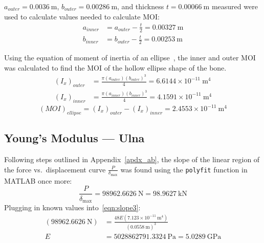 \documentclass[conference, letterpaper]{IEEEtran}
\begin{document}
            \(a_{outer} = 0.0036\ \text{m}\), \(b_{outer} = 0.00286\ \text{m}\), and thickness \(t = 0.00066\ \text{m}\) measured were used to calculate values needed to calculate MOI:\@
            \begin{align*}
                a_{inner} &= a_{outer} - \frac{t}{2} = 0.00327\ \text{m}\\
                b_{inner} &= b_{outer} - \frac{t}{2} = 0.00253\ \text{m}
            \end{align*} 

            Using the equation of moment of inertia of an ellipse~\cite{3LM2023}, the inner and outer MOI was calculated to find the MOI of the hollow ellipse shape of the bone.
            \begin{align*}
                {(I_x)}_{outer}
                &= \frac{\pi (a_{outer}) {(b_{outer})}^3}{4} = 6.6144\times10^{-11}\ \text{m}^4\\
                {(I_x)}_{inner}
                &= \frac{\pi (a_{inner}) {(b_{inner})}^3}{4} = 4.1591\times10^{-11}\ \text{m}^4
            \end{align*}
            \[
                {(MOI)}_{ellipse} 
                = {(I_x)}_{outer} - {(I_x)}_{inner} 
                = 2.4553\times10^{-11}\ \text{m}^4
            \]
            
        \subsection{Young's Modulus --- Ulna}\label{apdx_bb}
            Following steps outlined in Appendix~\ref{apdx_ab}, the slope of the linear region of the force vs.\ displacement curve \(\frac{P}{\delta_{\max}}\) was found using the \texttt{polyfit} function in MATLAB once more:\@
            \[
                \frac{P}{\delta_{\max}} 
                = 98962.6626\ \text{N}
                = 98.9627\ \text{kN}
            \]
            Plugging in known values into~\eqref{eqn:slope3}:
            \begin{align*}
                (98962.6626\ \text{N})
                &= \frac{48E(7.123\times10^{-11}\ \text{m}^4)}{{(0.0558\ \text{m})}^3}\\
                E 
                &= 5028862791.3324\ \text{Pa}
                = 5.0289\ \text{GPa}
            \end{align*}
\end{document}
